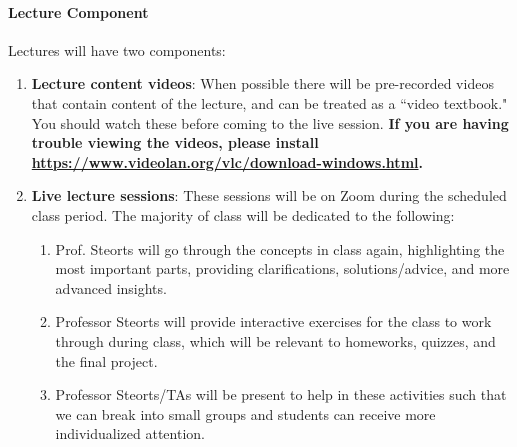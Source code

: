 \documentclass[11pt]{article}
\begin{document}
\paragraph{Lecture Component}
Lectures will have two components:
\begin{enumerate}
\item \textbf{Lecture content videos}: When possible there will be pre-recorded videos that contain content of the lecture, and can be treated as a ``video textbook." You should watch these before coming to the live session. \textbf{If you are having trouble viewing the videos, please install \url{https://www.videolan.org/vlc/download-windows.html}.}
\item \textbf{Live lecture sessions}: These sessions will be on Zoom during the scheduled class period. The majority of class will be dedicated to the following:
\begin{enumerate}
\item Prof. Steorts will go through the concepts in class again, highlighting the most important parts, providing clarifications, solutions/advice, and more advanced insights.
\item Professor Steorts will provide interactive exercises for the class to work through during class, which will be relevant to homeworks, quizzes, and the final project.
\item Professor Steorts/TAs will be present to help in these activities such that we can break into small groups and students can receive more individualized attention.
\end{enumerate}
\end{enumerate}
\end{document}
